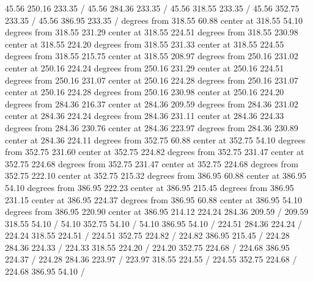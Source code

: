 {\setsolid
{} 45.56 250.16 233.35 /
\setsolid
{} 45.56 284.36 233.35 /
\setsolid
{} 45.56 318.55 233.35 /
\setsolid
{} 45.56 352.75 233.35 /
\setsolid
{} 45.56 386.95 233.35 /
 degrees from 318.55 60.88 center at 318.55 54.10
 degrees from 318.55 231.29 center at 318.55 224.51
 degrees from 318.55 230.98 center at 318.55 224.20
 degrees from 318.55 231.33 center at 318.55 224.55
 degrees from 318.55 215.75 center at 318.55 208.97
 degrees from 250.16 231.02 center at 250.16 224.24
 degrees from 250.16 231.29 center at 250.16 224.51
 degrees from 250.16 231.07 center at 250.16 224.28
 degrees from 250.16 231.07 center at 250.16 224.28
 degrees from 250.16 230.98 center at 250.16 224.20
 degrees from 284.36 216.37 center at 284.36 209.59
 degrees from 284.36 231.02 center at 284.36 224.24
 degrees from 284.36 231.11 center at 284.36 224.33
 degrees from 284.36 230.76 center at 284.36 223.97
 degrees from 284.36 230.89 center at 284.36 224.11
 degrees from 352.75 60.88 center at 352.75 54.10
 degrees from 352.75 231.60 center at 352.75 224.82
 degrees from 352.75 231.47 center at 352.75 224.68
 degrees from 352.75 231.47 center at 352.75 224.68
 degrees from 352.75 222.10 center at 352.75 215.32
 degrees from 386.95 60.88 center at 386.95 54.10
 degrees from 386.95 222.23 center at 386.95 215.45
 degrees from 386.95 231.15 center at 386.95 224.37
 degrees from 386.95 60.88 center at 386.95 54.10
 degrees from 386.95 220.90 center at 386.95 214.12
\setdashpattern <4pt, 4pt>
 224.24 284.36 209.59 /
 209.59 318.55 54.10 /
 54.10 352.75 54.10 /
 54.10 386.95 54.10 /
\setdashpattern <4pt, 4pt>
 224.51 284.36 224.24 /
 224.24 318.55 224.51 /
 224.51 352.75 224.82 /
 224.82 386.95 215.45 /
\setdashpattern <4pt, 4pt>
 224.28 284.36 224.33 /
 224.33 318.55 224.20 /
 224.20 352.75 224.68 /
 224.68 386.95 224.37 /
\setdashpattern <4pt, 4pt>
 224.28 284.36 223.97 /
 223.97 318.55 224.55 /
 224.55 352.75 224.68 /
 224.68 386.95 54.10 /
\setdashpattern <4pt, 4pt>
}
